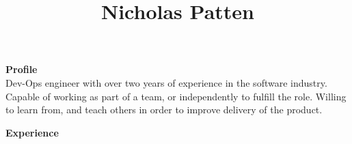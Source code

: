 \documentclass[a4paper,12pt,final,sans]{memoir}
\title{\vspace{-2.5cm} \textbf{\textsf{\color{head} Nicholas Patten}}\\}
\date{\vspace{-7.0em}}
\begin{document}
 
\maketitle %
\thispagestyle{empty} %

\vspace{2mm}
\textbf{\textsf{\color{head} \large{Profile} }} \\[0.3em]
Dev-Ops engineer with over two years of experience in the software industry. Capable of working as part of a team, or independently to fulfill the role. Willing to learn from, and teach others in order to improve delivery of the product. \\


\vskip-1mm

\textbf{\textsf{\color{head} \large{Experience} }}\\[-1.5em]
\end{document}
